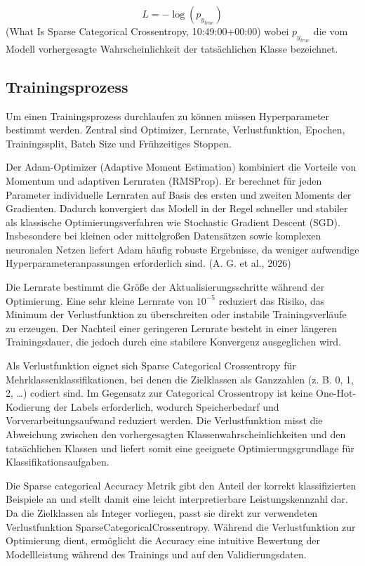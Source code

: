 $$L = -\log(p_{y_{true}})$$
(What Is Sparse Categorical Crossentropy, 10:49:00+00:00) wobei $p_{y_{true}}$ die vom Modell vorhergesagte Wahrscheinlichkeit der tatsächlichen Klasse bezeichnet.

\subsection{Trainingsprozess}

Um einen Trainingsprozess durchlaufen zu können müssen Hyperparameter bestimmt werden. Zentral sind Optimizer, Lernrate, Verlustfunktion, Epochen, Trainingssplit, Batch Size und Frühzeitiges Stoppen.

Der Adam-Optimizer (Adaptive Moment Estimation) kombiniert die Vorteile von Momentum und adaptiven Lernraten (RMSProp). Er berechnet für jeden Parameter individuelle Lernraten auf Basis des ersten und zweiten Moments der Gradienten. Dadurch konvergiert das Modell in der Regel schneller und stabiler als klassische Optimierungsverfahren wie Stochastic Gradient Descent (SGD). Insbesondere bei kleinen oder mittelgroßen Datensätzen sowie komplexen neuronalen Netzen liefert Adam häufig robuste Ergebnisse, da weniger aufwendige Hyperparameteranpassungen erforderlich sind. (A. G. et al., 2026)

Die Lernrate bestimmt die Größe der Aktualisierungsschritte während der Optimierung. Eine sehr kleine Lernrate von $10^{-5}$ reduziert das Risiko, das Minimum der Verlustfunktion zu überschreiten oder instabile Trainingsverläufe zu erzeugen. Der Nachteil einer geringeren Lernrate besteht in einer längeren Trainingsdauer, die jedoch durch eine stabilere Konvergenz ausgeglichen wird.

Als Verlustfunktion eignet sich Sparse Categorical Crossentropy für Mehrklassenklassifikationen, bei denen die Zielklassen als Ganzzahlen (z. B. 0, 1, 2, …) codiert sind. Im Gegensatz zur Categorical Crossentropy ist keine One-Hot-Kodierung der Labels erforderlich, wodurch Speicherbedarf und Vorverarbeitungsaufwand reduziert werden. Die Verlustfunktion misst die Abweichung zwischen den vorhergesagten Klassenwahrscheinlichkeiten und den tatsächlichen Klassen und liefert somit eine geeignete Optimierungsgrundlage für Klassifikationsaufgaben.

Die Sparse categorical Accuracy Metrik gibt den Anteil der korrekt klassifizierten Beispiele an und stellt damit eine leicht interpretierbare Leistungskennzahl dar. Da die Zielklassen als Integer vorliegen, passt sie direkt zur verwendeten Verlustfunktion SparseCategoricalCrossentropy. Während die Verlustfunktion zur Optimierung dient, ermöglicht die Accuracy eine intuitive Bewertung der Modellleistung während des Trainings und auf den Validierungsdaten.

